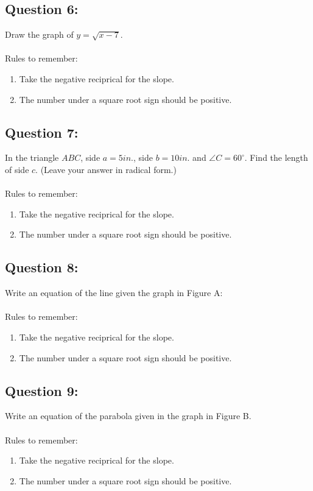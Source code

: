 \documentclass[12pt, letterpaper]{article}
\begin{document}
\subsection{Question 6:}
  Draw the graph of $y=\sqrt{x-7}$.
  \\\\
  Rules to remember:
  \begin{enumerate}
    \item Take the negative reciprical for the slope.
    \item The number under a square root sign should be positive.
  \end{enumerate}

\subsection{Question 7:}
  In the triangle $ABC$, side $a=5in.$, side $b=10in.$ and $\angle C=60^\circ$.
  Find the length of side $c$. (Leave your answer in radical form.) 
  \\\\
  Rules to remember:
  \begin{enumerate}
    \item Take the negative reciprical for the slope.
    \item The number under a square root sign should be positive.
  \end{enumerate}

\subsection{Question 8:}
  Write an equation of the line given the graph in Figure A:
  \\\\
  Rules to remember:
  \begin{enumerate}
    \item Take the negative reciprical for the slope.
    \item The number under a square root sign should be positive.
  \end{enumerate}

\subsection{Question 9:}
  Write an equation of the parabola given in the graph in Figure B. 
  \\\\
  Rules to remember:
  \begin{enumerate}
    \item Take the negative reciprical for the slope.
    \item The number under a square root sign should be positive.
  \end{enumerate}
\end{document}
